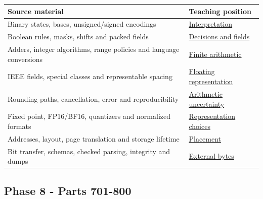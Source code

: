 {\def\LTcaptype{none} %
\begin{longtable}[]{@{}
  >{\raggedright\arraybackslash}p{}
  >{\raggedright\arraybackslash}p{}@{}}
\toprule\noalign{}
\begin{minipage}[b]{\linewidth}\raggedright
Source material
\end{minipage} & \begin{minipage}[b]{\linewidth}\raggedright
Teaching position
\end{minipage} \\
\midrule\noalign{}
\endhead
\bottomrule\noalign{}
\endlastfoot
Binary states, bases, unsigned/signed encodings & \hyperref[01-foundations-i-ch001-from-a-signal-to-an-interpretation]{Interpretation} \\
Boolean rules, masks, shifts and packed fields & \hyperref[01-foundations-i-ch001-bits-become-decisions-and-compact-fields]{Decisions and fields} \\
Adders, integer algorithms, range policies and language conversions & \hyperref[01-foundations-i-ch001-arithmetic-becomes-a-policy]{Finite arithmetic} \\
IEEE fields, special classes and representable spacing & \hyperref[01-foundations-i-ch001-a-stretching-ruler-for-real-valued-quantities]{Floating representation} \\
Rounding paths, cancellation, error and reproducibility & \hyperref[01-foundations-i-ch001-when-arithmetic-meets-uncertainty]{Arithmetic uncertainty} \\
Fixed point, FP16/BF16, quantizers and normalized formats & \hyperref[01-foundations-i-ch001-choosing-what-information-to-keep]{Representation choices} \\
Addresses, layout, page translation and storage lifetime & \hyperref[01-foundations-i-ch002-where-the-bytes-live]{Placement} \\
Bit transfer, schemas, checked parsing, integrity and dumps & \hyperref[01-foundations-i-ch002-bytes-become-a-durable-agreement]{External bytes} \\
\end{longtable}
}

\subsection{Phase 8 - Parts 701-800}\label{appendix-fd090d982a15-phase-8---parts-701-800}

